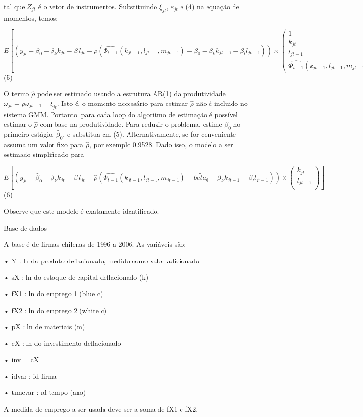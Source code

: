 tal que $Z_{jt}$ é o vetor de instrumentos. Substituindo $\xi_{jt}$, $\varepsilon_{jt}$ e (4) na equação de momentos, temos:

$E[(y_{jt} - \beta_0 - \beta_k k_{jt} - \beta_l l_{jt} -\rho(\hat{\Phi_{t-1}}(k_{jt-1}, l_{jt-1},m_{jt-1}) - \beta_{0} - \beta_k k_{jt-1} - \beta_l l_{jt-1}))  \times \begin{pmatrix} 
  1 \\ 
  k_{jt} \\
  l_{jt-1} \\
  \hat{\Phi_{t-1}}(k_{jt-1}, l_{jt-1},m_{jt-1})
  \end{pmatrix}]$  (5)

O termo $\hat{\rho}$ pode ser estimado usando a estrutura AR(1) da produtividade $\omega_{jt} = \rho \omega_{jt−1} + \xi_{jt}$. Isto é, o momento necessário para estimar $\hat{\rho}$ não é incluido no sistema GMM. Portanto, para cada loop do algoritmo de estimação é possível estimar o $\hat{\rho}$ com base na produtividade.
Para reduzir o problema, estime $\beta_0$ no primeiro estágio, $\tilde{\beta_0}$, e substitua em (5). Alternativamente, se for conveniente assuma um valor fixo para $\hat{\rho}$, por
exemplo 0.9528. Dado isso, o modelo a ser estimado simplificado para

$E[(y_{jt} - \tilde{\beta_0} - \beta_k k_{jt} - \beta_l l_{jt} -\hat{\rho}(\hat{\Phi_{t-1}}(k_{jt-1}, l_{jt-1},m_{jt-1})- \tilde{beta_0} - \beta_k k_{jt-1} - \beta_l l_{jt-1}))  \times \begin{pmatrix} 
  k_{jt} \\
  l_{jt-1} \\
\end{pmatrix}]$ (6)

Observe que este modelo é exatamente identificado.


Base de dados

A base é de firmas chilenas de 1996 a 2006. As variáveis são:

• Y : ln do produto deflacionado, medido como valor adicionado

• sX : ln do estoque de capital deflacionado (k)

• fX1 : ln do emprego 1 (blue c)

• fX2 : ln do emprego 2 (white c)

• pX : ln de materiais (m)

• cX : ln do investimento deflacionado

• inv = cX

• idvar : id firma

• timevar : id tempo (ano)

A medida de emprego a ser usada deve ser a soma de fX1 e fX2.